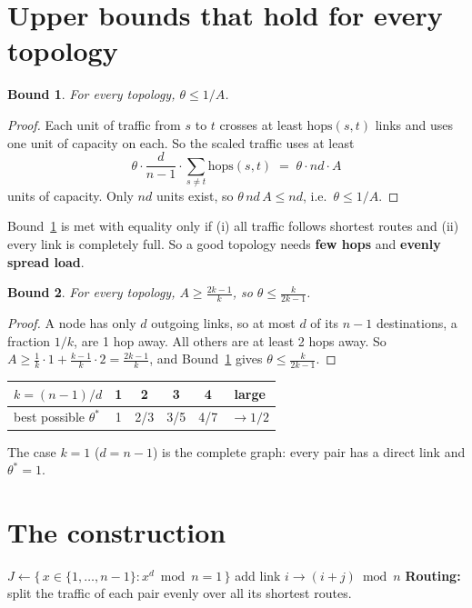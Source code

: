 \documentclass[11pt]{article}
\newtheorem{bound}{Bound}
\theoremstyle{definition}
\begin{document}
\section{Upper bounds that hold for every topology}

\begin{bound}\label{b:1}
For every topology, $\theta \le 1/A$.
\end{bound}
\begin{proof}
Each unit of traffic from $s$ to $t$ crosses at least $\mathrm{hops}(s,t)$ links and uses one unit of capacity on
each. So the scaled traffic uses at least
\[
\theta\cdot\frac{d}{n-1}\cdot\sum_{s\ne t}\mathrm{hops}(s,t) \;=\; \theta \cdot nd \cdot A
\]
units of capacity. Only $nd$ units exist, so $\theta\, nd\, A \le nd$, i.e.\ $\theta \le 1/A$.
\end{proof}

\noindent Bound~\ref{b:1} is met with equality only if (i) all traffic follows shortest routes and (ii) every link is
completely full. So a good topology needs \textbf{few hops} and \textbf{evenly spread load}.

\begin{bound}\label{b:2}
For every topology, $A \ge \frac{2k-1}{k}$, so $\theta \le \frac{k}{2k-1}$.
\end{bound}
\begin{proof}
A node has only $d$ outgoing links, so at most $d$ of its $n-1$ destinations, a fraction $1/k$, are 1 hop away. All
others are at least 2 hops away. So $A \ge \frac{1}{k}\cdot 1 + \frac{k-1}{k}\cdot 2 = \frac{2k-1}{k}$, and
Bound~\ref{b:1} gives $\theta \le \frac{k}{2k-1}$.
\end{proof}

\begin{table}[H]
\centering
\begin{tabular}{l ccccc}
\toprule
$k = (n-1)/d$ & 1 & 2 & 3 & 4 & large \\
\midrule
best possible $\theta^*$ & 1 & 2/3 & 3/5 & 4/7 & $\to 1/2$ \\
\bottomrule
\end{tabular}
\end{table}
\noindent The case $k=1$ ($d = n-1$) is the complete graph: every pair has a direct link and $\theta^*=1$.

\section{The construction}

\begin{algorithm}[H]
\caption{\textsc{BuildTopology}$(n,d)$, for $n$ prime and $d \mid n-1$}
\begin{algorithmic}[1]
\State $J \gets \{\, x \in \{1,\dots,n-1\} : x^d \bmod n = 1 \,\}$ 
    \State add link $i \to (i+j) \bmod n$ 
  \EndFor
\EndFor
\State \textbf{Routing:} split the traffic of each pair evenly over all its shortest routes.
\end{algorithmic}
\end{algorithm}
\end{document}
